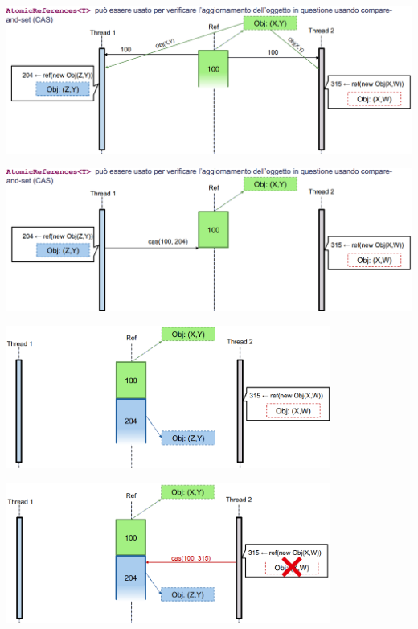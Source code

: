 \documentclass[12pt]{article}
\begin{document}
\begin{center}
    \includegraphics[width = 1\textwidth]{Images/96.png}
\end{center}
\begin{center}
    \includegraphics[width = 1\textwidth]{Images/97.png}
\end{center}
\begin{center}
    \hfill
    \includegraphics[width = 0.80\textwidth]{Images/98.png}
\end{center}
\begin{center}
    \hfill
    \includegraphics[width = 0.80\textwidth]{Images/99.png}
\end{center}
\end{document}
